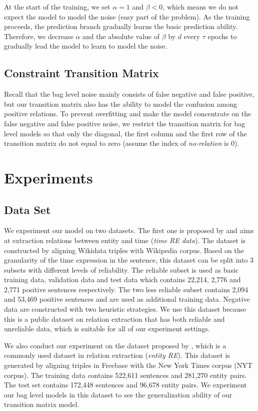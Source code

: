 \documentclass[11pt,a4paper]{article}
\begin{document}
At the start of the training, we set $\alpha=1$ and $\beta<0$, which means we do not expect the model to model the noise (easy part of the problem). As the training proceeds, the prediction branch gradually learns the basic prediction ability. Therefore, we decrease $\alpha$ and the absolute value of $\beta$ by $d$ every $\tau$ epochs to gradually lead the model to learn to model the noise.  

\subsection{Constraint Transition Matrix}
Recall that the bag level noise mainly consists of false negative and false positive, but our transition matrix also has the ability to model the confusion among positive relations. To prevent overfitting and make the model concentrate on the false negative and false positive noise, we restrict the transition matrix for bag level models so that only the diagonal, the first column and the first row of the transition matrix do not equal to zero (assume the index of \emph{no-relation} is 0).  


\section{Experiments}
\subsection{Data Set}
We experiment our model on two datasets. The first one is proposed by \cite{luo2016temporal} and aims at extraction relations between entity and time (\emph{time RE data}). The dataset is constructed by aligning Wikidata triples with Wikipedia corpus. Based on the granularity of the time expression in the sentence, this dataset can be split into 3 subsets with different levels of reliability. The reliable subset is used as basic training data, validation data and test data which contains 22,214, 2,776 and 2,771 positive sentences respectively. The two less reliable subset contains 2,094 and 53,469 positive sentences and are used as additional training data. Negative data are constructed with two heuristic strategies. We use this dataset because this is a public dataset on relation extraction that has both reliable and unreliable data, which is suitable for all of our experiment settings.

We also conduct our experiment on the dataset proposed by \cite{riedel2010modeling}, which is a commonly used dataset in relation extraction (\emph{entity RE}). This dataset is generated by aligning triples in Freebase with the New York Times corpus (NYT corpus). The training data contains 522,611 sentences and 281,270 entity pairs. The test set contains 172,448 sentences and 96,678 entity pairs. We experiment our bag level models in this dataset to see the generalization ability of our transition matrix model.
\end{document}
